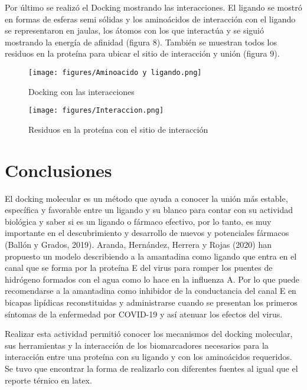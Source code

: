 \documentclass[12pt]{article}
\begin{document}
Por último se realizó el Docking mostrando las interacciones. El ligando se mostró en formas de esferas semi sólidas y los aminoácidos de interacción con el ligando se representaron en jaulas, los átomos con los que interactúa y se siguió mostrando la energía de afinidad (figura 8).  También se muestran todos los residuos en la proteína para ubicar el sitio de interacción y unión (figura 9). 

\begin{figure}[!ht]
 \centering
 \texttt{[image: figures/Aminoacido y ligando.png]}
 \caption{Docking con las interacciones}
 \label{fig:exemplo}
\end{figure}


\begin{figure}[!ht]
 \centering
 \texttt{[image: figures/Interaccion.png]}
 \caption{Residuos en la proteína con el sitio de interacción}
 \label{fig:exemplo}
\end{figure}


\section{Conclusiones}
\label{sec:conclusao}
	

El docking molecular es un método que ayuda a conocer la unión más estable, específica y favorable entre un ligando y su blanco para contar con su actividad biológica y saber si es un ligando o fármaco efectivo, por lo tanto, es muy importante en el descubrimiento y desarrollo de nuevos y potenciales fármacos (Ballón y Grados, 2019). Aranda, Hernández, Herrera y Rojas (2020) han propuesto un modelo describiendo a la amantadina como ligando que entra en el canal que se forma por la proteína E del virus para romper los puentes de hidrógeno formados con el agua como lo hace en la influenza A. Por lo que puede recomendarse a la amantadina como inhibidor de la conductancia del canal E en bicapas lipídicas reconstituidas y administrarse cuando se presentan los primeros síntomas de la enfermedad por COVID-19 y así atenuar los efectos del virus. 

Realizar esta actividad permitió conocer los mecanismos del docking molecular, sus herramientas y la interacción de los biomarcadores necesarios para la interacción entre una proteína con su ligando y con los aminoácidos requeridos. Se tuvo que encontrar la forma de realizarlo con diferentes fuentes al igual que el reporte térnico en latex. 
\end{document}
